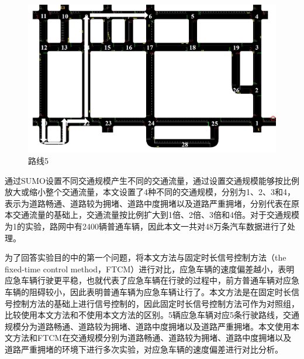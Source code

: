 \begin{figure}[H]
	\centering
	\includegraphics[width=\linewidth]{figures/route5.jpg}
	\caption{路线5}
	\label{fig:route5}
\end{figure}

通过SUMO设置不同交通规模产生不同的交通流量，通过设置交通规模能够按比例放大或缩小整个交通流量，本文设置了4种不同的交通规模，分别为1、2、3和4，表示为道路畅通、道路较为拥堵、道路中度拥堵以及道路严重拥堵，分别代表在原本交通流量的基础上，交通流量按比例扩大到1倍、2倍、3倍和4倍。对于交通规模为1的实验，路网中有2400辆普通车辆，因此本文一共对48万条汽车数据进行了处理。

为了回答实验目的中的第一个问题，将本文方法与固定时长信号控制方法（the fixed-time control method，FTCM）进行对比，应急车辆的速度偏差越小，表明应急车辆行驶更平稳，也就代表了应急车辆在行驶的过程中，前方普通车辆对应急车辆的阻碍较小，因此表明普通车辆为应急车辆让行了。本文方法是在固定时长信号控制方法的基础上进行信号控制的，因此固定时长信号控制方法可作为对照组，比较使用本文方法和不使用本文方法的区别。5辆应急车辆对应5条行驶路线，交通规模分为道路畅通、道路较为拥堵、道路中度拥堵以及道路严重拥堵。本文使用本文方法和FTCM在交通规模分别为道路畅通、道路较为拥堵、道路中度拥堵以及道路严重拥堵的环境下进行多次实验，对应急车辆的速度偏差进行对比分析。


